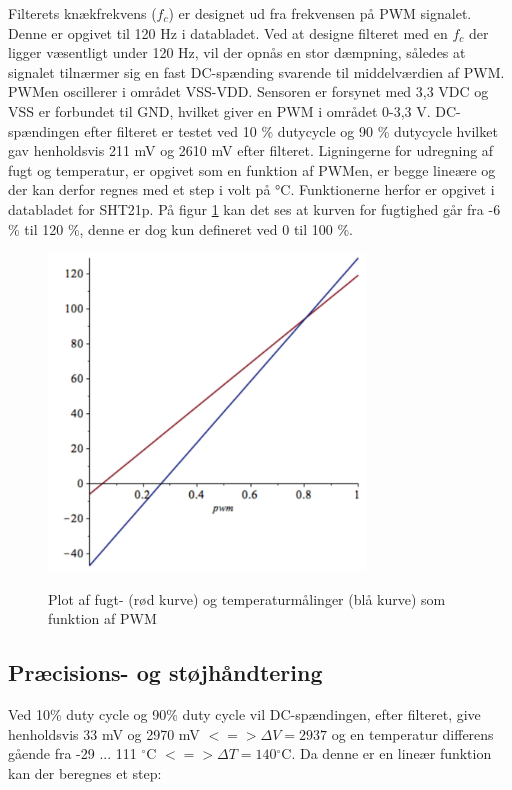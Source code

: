 Filterets knækfrekvens ($f_c$) er designet ud fra frekvensen på PWM signalet. Denne er opgivet til 120 Hz i databladet. Ved at designe filteret med en $f_c$ der ligger væsentligt under 120 Hz, vil der opnås en stor dæmpning, således at signalet tilnærmer sig en fast DC-spænding svarende til middelværdien af PWM. PWMen oscillerer i området VSS-VDD. Sensoren er forsynet med 3,3 VDC og VSS er forbundet til GND, hvilket giver en PWM i området 0-3,3 V. DC-spændingen efter filteret er testet ved 10 \% dutycycle og 90 \% dutycycle hvilket gav henholdsvis 211 mV og 2610 mV efter filteret. Ligningerne for udregning af fugt og temperatur, er opgivet som en funktion af PWMen, er begge lineære og der kan derfor regnes med et step i volt på °C. Funktionerne herfor er opgivet i databladet for SHT21p. 
På figur \ref{lab:sht_plot_mable} kan det ses at kurven for fugtighed går fra -6 \% til 120 \%, denne er dog kun defineret ved 0 til 100 \%. 

\begin{figure}[H]
\centering
{\includegraphics[width=0.75\textwidth]{filer/design/Billeder/sht_plot_maple}}
\caption{Plot af fugt- (rød kurve) og temperaturmålinger (blå kurve) som funktion af PWM}
\label{lab:sht_plot_mable}
\end{figure}

\subsection{Præcisions- og støjhåndtering}

Ved 10\% duty cycle og 90\% duty cycle vil DC-spændingen, efter filteret, give henholdsvis 33 mV og 2970 mV $<=> \Delta V = 2937$ og en temperatur differens gående fra -29 ... 111 ${^{\circ}}$C $<=> \Delta T = 140 {^{\circ}}$C. Da denne er en lineær funktion kan der beregnes et step:

